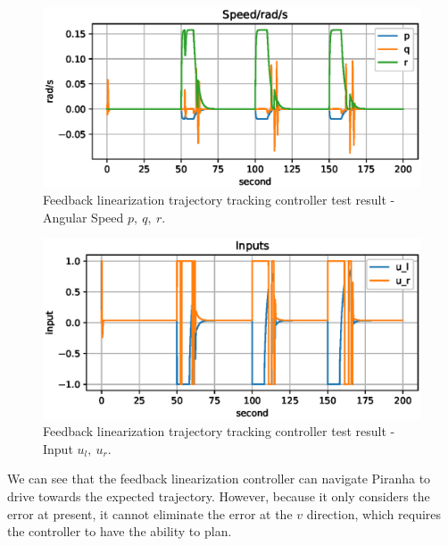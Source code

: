 \begin{figure}[H]
    \centering
    \includegraphics[width=.8\textwidth]{images/05fl-result-square-pqr.eps}
    \caption{Feedback linearization trajectory tracking controller test result - Angular Speed $p,\ q,\ r$.}
    \label{fig:05fl-result-square-pqr}
\end{figure}

\begin{figure}[H]
    \centering
    \includegraphics[width=.8\textwidth]{images/05fl-result-square-u.eps}
    \caption{Feedback linearization trajectory tracking controller test result - Input $u_l,\ u_r$.}
    \label{fig:05fl-result-square-u}
\end{figure}

We can see that the feedback linearization controller can navigate Piranha to drive towards the expected trajectory. However, because it only considers the error at present, it cannot eliminate the error at the $v$ direction, which requires the controller to have the ability to plan. 